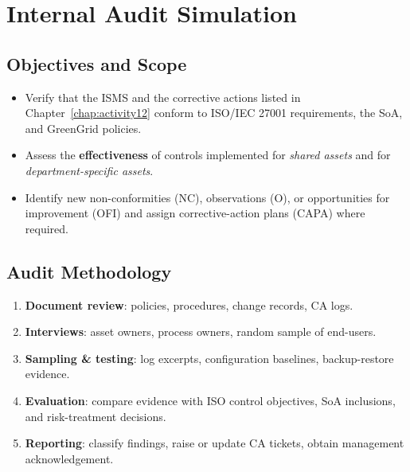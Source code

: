 \chapter{Internal Audit Simulation}
\label{chap:internal_audit}

\section{Objectives and Scope}
\begin{itemize}
  \item Verify that the \ac{ISMS} and the corrective actions listed in
        Chapter~\ref{chap:activity12} conform to ISO/IEC 27001 requirements,
        the \ac{SoA}, and GreenGrid policies.
  \item Assess the \textbf{effectiveness} of controls implemented for
        \emph{shared assets} and for \emph{department-specific assets}.
  \item Identify new non-conformities (NC), observations (O), or
        opportunities for improvement (OFI) and assign corrective-action
        plans (CAPA) where required.
\end{itemize}

\section{Audit Methodology}
\begin{enumerate}
  \item \textbf{Document review}: policies, procedures, change records,
        CA logs.
  \item \textbf{Interviews}: asset owners, process owners, random sample
        of end-users.
  \item \textbf{Sampling \& testing}: log excerpts, configuration
        baselines, backup-restore evidence.
  \item \textbf{Evaluation}: compare evidence with ISO control objectives,
        \ac{SoA} inclusions, and risk-treatment decisions.
  \item \textbf{Reporting}: classify findings, raise or update CA tickets,
        obtain management acknowledgement.
\end{enumerate}

